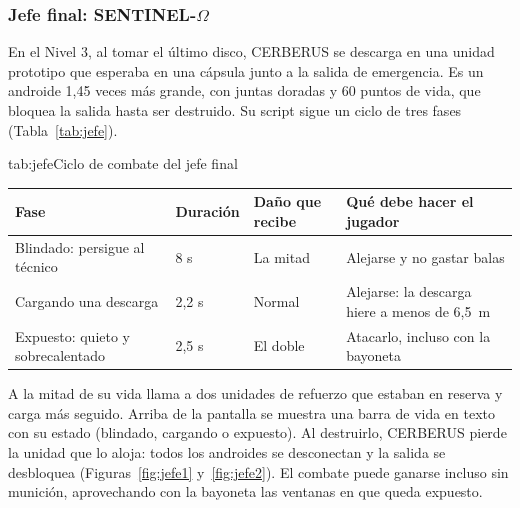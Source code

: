 
\subsubsection{Jefe final: SENTINEL-\texorpdfstring{$\Omega$}{Omega}}

En el Nivel 3, al tomar el último disco, CERBERUS se descarga en una unidad prototipo que esperaba en
una cápsula junto a la salida de emergencia. Es un androide 1,45 veces más grande, con juntas
doradas y 60 puntos de vida, que bloquea la salida hasta ser destruido. Su script
 sigue un ciclo de tres fases (Tabla~\ref{tab:jefe}).

\begin{TablaAPA}{tab:jefe}{Ciclo de combate del jefe final}
\begin{tabularx}{\linewidth}{P{3.6cm}P{1.6cm}P{2.6cm}L}
\toprule
Fase & Duración & Daño que recibe & Qué debe hacer el jugador \\
\midrule
Blindado: persigue al técnico & 8 s & La mitad & Alejarse y no gastar balas \\
Cargando una descarga & 2,2 s & Normal & Alejarse: la descarga hiere a menos de 6,5~m \\
Expuesto: quieto y sobrecalentado & 2,5 s & El doble & Atacarlo, incluso con la bayoneta \\
\bottomrule
\end{tabularx}
\end{TablaAPA}

A la mitad de su vida llama a dos unidades de refuerzo que estaban en reserva y carga más seguido.
Arriba de la pantalla se muestra una barra de vida en texto con su estado (blindado, cargando o
expuesto). Al destruirlo, CERBERUS pierde la unidad que lo aloja: todos los androides se desconectan
y la salida se desbloquea (Figuras~\ref{fig:jefe1} y~\ref{fig:jefe2}). El combate puede ganarse
incluso sin munición, aprovechando con la bayoneta las ventanas en que queda expuesto.



